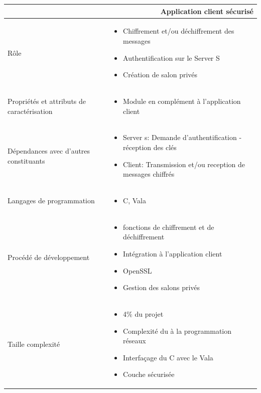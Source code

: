 \documentclass[a4paper,11pt,french]{article}
\begin{document}
\begin{center}
	\vspace*{0.7cm}
	\begin{tabularx}{16cm}{|l|X|}
	\hline
	\multicolumn{2}{|r|}{\textbf{Application client sécurisé}}\\
	\hline
	R\^ole &  \begin{itemize}\item Chiffrement et/ou déchiffrement des messages \item Authentification sur le Server S \item Création de salon privés\end{itemize}\\
	\hline
	Propriétés et attributs de caractérisation & \begin{itemize} \item Module en complément à l'application client \end{itemize}\\
	\hline
	Dépendances avec d'autres constituants & \begin{itemize}\item Server s: Demande d'authentification - réception des clés \item Client: Transmission et/ou reception de messages chiffrés \end{itemize}\\
	\hline
	Langages de programmation & \begin{itemize} \item C, Vala \end{itemize}\\
	\hline
	Procédé de développement & \begin{itemize}\item fonctions de chiffrement et de déchiffrement \item Intégration à l'application client \item OpenSSL \item Gestion des salons privés\end{itemize}\\
	\hline
	Taille complexité & \begin{itemize}\item 4\% du projet \item Complexité du à la programmation réseaux \item Interfa\c cage du C avec le Vala \item Couche sécurisée\end{itemize}\\
	\hline
	\end{tabularx}
\end{center}
\end{document}
